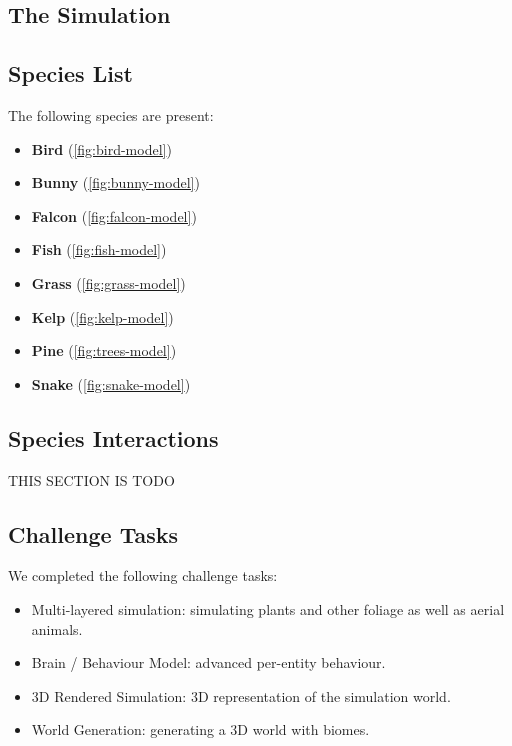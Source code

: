 \documentclass{article}
\begin{document}
    \begin{multicols}{2}
        \section{The Simulation}

        \subsection{Species List}

            The following species are present:

            \begin{itemize}
                \setlength\itemsep{0.01em}
                \item \textbf{Bird} (\autoref{fig:bird-model})
                \item \textbf{Bunny} (\autoref{fig:bunny-model})
                \item \textbf{Falcon} (\autoref{fig:falcon-model})
                \item \textbf{Fish} (\autoref{fig:fish-model})
                \item \textbf{Grass} (\autoref{fig:grass-model})
                \item \textbf{Kelp} (\autoref{fig:kelp-model})
                \item \textbf{Pine} (\autoref{fig:trees-model})
                \item \textbf{Snake} (\autoref{fig:snake-model})
            \end{itemize}

        \subsection{Species Interactions}

            THIS SECTION IS TODO
        
        \subsection{Challenge Tasks}

            We completed the following challenge tasks:

            \begin{itemize}
                \setlength\itemsep{0.01em}
                \item Multi-layered simulation: simulating plants and other foliage as well as aerial animals.
                \item Brain / Behaviour Model: advanced per-entity behaviour.
                \item 3D Rendered Simulation: 3D representation of the simulation world.
                \item World Generation: generating a 3D world with biomes.
            \end{itemize}


\end{multicols}
\end{document}
